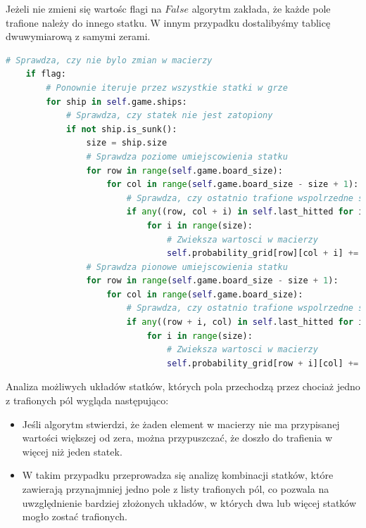 \documentclass[magisterska]{pracadypl}
\begin{document}
Jeżeli nie zmieni się wartośc flagi na $False$ algorytm zakłada, że każde pole trafione należy do innego statku. W innym przypadku dostalibyśmy tablicę dwuwymiarową z samymi zerami.
\begin{lstlisting}[language=Python, caption=Dalszy fragment kodu metody update\_probability\_grid\_hitted\_ship  klasy ProbabilityStrategy ] 
# Sprawdza, czy nie bylo zmian w macierzy
    if flag:
        # Ponownie iteruje przez wszystkie statki w grze
        for ship in self.game.ships:
            # Sprawdza, czy statek nie jest zatopiony
            if not ship.is_sunk():
                size = ship.size
                # Sprawdza poziome umiejscowienia statku
                for row in range(self.game.board_size):
                    for col in range(self.game.board_size - size + 1):
                        # Sprawdza, czy ostatnio trafione wspolrzedne sa w danym umiejscowieniu
                        if any((row, col + i) in self.last_hitted for i in range(size)) and all(self.game.board[row][col + i] in [" ", "S", "X"] for i in range(size)):
                            for i in range(size):
                                # Zwieksza wartosci w macierzy
                                self.probability_grid[row][col + i] += 1
                # Sprawdza pionowe umiejscowienia statku
                for row in range(self.game.board_size - size + 1):
                    for col in range(self.game.board_size):
                        # Sprawdza, czy ostatnio trafione wspolrzedne sa w danym umiejscowieniu
                        if any((row + i, col) in self.last_hitted for i in range(size)) and all(self.game.board[row + i][col] in [" ", "S", "X"] for i in range(size)):
                            for i in range(size):
                                # Zwieksza wartosci w macierzy
                                self.probability_grid[row + i][col] += 1
\end{lstlisting}
Analiza możliwych układów statków, których pola przechodzą przez chociaż jedno z trafionych pól wygląda następująco:
\begin{itemize}
\item Jeśli algorytm stwierdzi, że żaden element w macierzy nie ma przypisanej wartości większej od zera, można przypuszczać, że doszło do trafienia w więcej niż jeden statek.
\item W takim przypadku przeprowadza się analizę kombinacji statków, które zawierają przynajmniej jedno pole z listy trafionych pól, co pozwala na uwzględnienie bardziej złożonych układów, w których dwa lub więcej statków mogło zostać trafionych.
\end{itemize}
\end{document}
